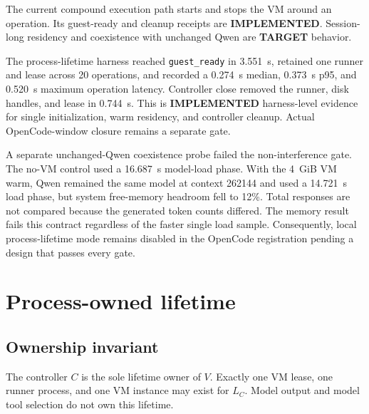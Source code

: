 \documentclass[10pt]{article}
\newcommand{\Implemented}{\textcolor{implemented}{\textbf{IMPLEMENTED}}}
\newcommand{\Target}{\textcolor{target}{\textbf{TARGET}}}
\newcommand{\code}[1]{\texttt{#1}}
\begin{document}
The current compound execution path starts and stops the VM around an operation.
Its guest-ready and cleanup receipts are \Implemented.  Session-long residency
and coexistence with unchanged Qwen are \Target{} behavior.

The process-lifetime harness reached \code{guest\_ready} in 3.551~s, retained
one runner and lease across 20 operations, and recorded a 0.274~s median,
0.373~s p95, and 0.520~s maximum operation latency.  Controller close removed
the runner, disk handles, and lease in 0.744~s.  This is \Implemented{}
harness-level evidence for single initialization, warm residency, and
controller cleanup.  Actual OpenCode-window closure remains a separate gate.

A separate unchanged-Qwen coexistence probe failed the non-interference gate.
The no-VM control used a 16.687~s model-load phase.  With the 4~GiB VM warm,
Qwen remained the same model at context 262144 and used a 14.721~s load phase,
but system free-memory headroom fell to 12\%.  Total responses are not compared
because the generated token counts differed.  The memory result fails this
contract regardless of the faster single load sample.  Consequently, local
process-lifetime mode remains disabled in the OpenCode registration pending a
design that passes every gate.

\section{Process-owned lifetime}

\subsection*{Ownership invariant}

The controller \(C\) is the sole lifetime owner of \(V\).  Exactly one VM lease,
one runner process, and one VM instance may exist for \(L_C\).  Model output and
model tool selection do not own this lifetime.
\end{document}
